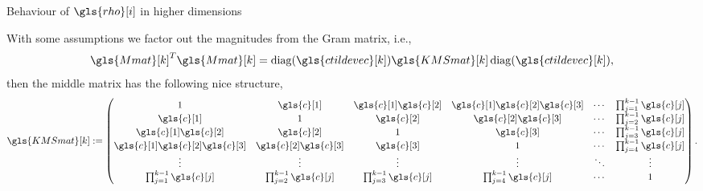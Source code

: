 \documentclass[aspectratio=169]{beamer}
\begin{document}
\begin{frame}{Behaviour of $\gls{rho}[i]$ in higher dimensions}

    With some assumptions we factor out the magnitudes from the Gram matrix, i.e.,
    \begin{equation}
        \gls{Mmat}[k]^T\gls{Mmat}[k] =
        \operatorname{diag}(\gls{ctildevec}[k])\gls{KMSmat}[k]\operatorname{diag}(\gls{ctildevec}[k]),
    \end{equation}
    then the middle matrix has the following nice structure,
    \begin{equation}
        \gls{KMSmat}[k] :=
        \begin{pmatrix}
            1 & \gls{c}[1] & \gls{c}[1]\gls{c}[2] & \gls{c}[1]\gls{c}[2]\gls{c}[3] & \cdots & \prod_{j=1}^{k-1}\gls{c}[j] \\
            \gls{c}[1] & 1 & \gls{c}[2] & \gls{c}[2]\gls{c}[3] & \cdots & \prod_{j=2}^{k-1}\gls{c}[j] \\
            \gls{c}[1]\gls{c}[2] & \gls{c}[2] & 1 & \gls{c}[3] & \cdots & \prod_{j=3}^{k-1}\gls{c}[j] \\
            \gls{c}[1]\gls{c}[2]\gls{c}[3] & \gls{c}[2]\gls{c}[3] & \gls{c}[3] & 1 & \cdots & \prod_{j=4}^{k-1}\gls{c}[j] \\
            \vdots & \vdots & \vdots & \vdots & \ddots & \vdots \\
            \prod_{j=1}^{k-1}\gls{c}[j] & \prod_{j=2}^{k-1}\gls{c}[j] & \prod_{j=3}^{k-1}\gls{c}[j] & \prod_{j=4}^{k-1}\gls{c}[j] & \cdots & 1
        \end{pmatrix}.
    \end{equation}


\end{frame}
\end{document}
